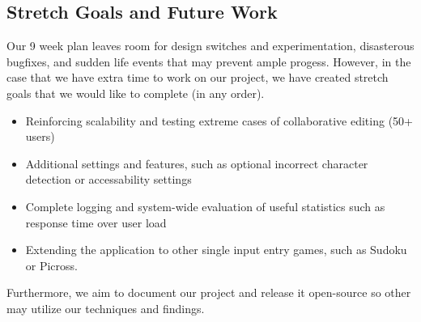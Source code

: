 \documentclass{article}
\begin{document}
\subsection{Stretch Goals and Future Work}
Our 9 week plan leaves room for design switches and experimentation, disasterous bugfixes, and sudden life events that
may prevent ample progess. However, in the case that we have extra time to work on our project, we have created stretch
goals that we would like to complete (in any order).
\begin{itemize}
    \item Reinforcing scalability and testing extreme cases of collaborative editing (50+ users)
    \item Additional settings and features, such as optional incorrect character detection or accessability settings
    \item Complete logging and system-wide evaluation of useful statistics such as response time over user load
    \item Extending the application to other single input entry games, such as Sudoku or Picross.
\end{itemize}

Furthermore, we aim to document our project and release it open-source so other may utilize our techniques and findings.

\newpage


\end{document}
